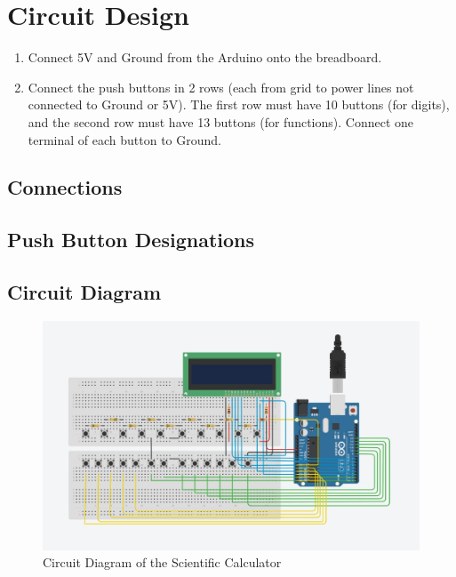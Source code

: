 \documentclass{article}
\begin{document}
\section{Circuit Design}
\begin{enumerate}
    \item Connect 5V and Ground from the Arduino onto the breadboard.
    \item Connect the push buttons in 2 rows (each from grid to power lines not connected to Ground or 5V). The first row must have 10 buttons (for digits), and the second row must have 13 buttons (for functions). Connect one terminal of each button to Ground.
\end{enumerate}
 
\subsection{Connections}
    
\newpage
\subsection{Push Button Designations}
    

\subsection{Circuit Diagram}
\begin{figure}[H] 
    \centering
    \includegraphics[width=1\textwidth]{Figures/tinkercad.jpeg}
    \caption{Circuit Diagram of the Scientific Calculator}
    \label{fig:circuit}
\end{figure}


  
\end{document}
